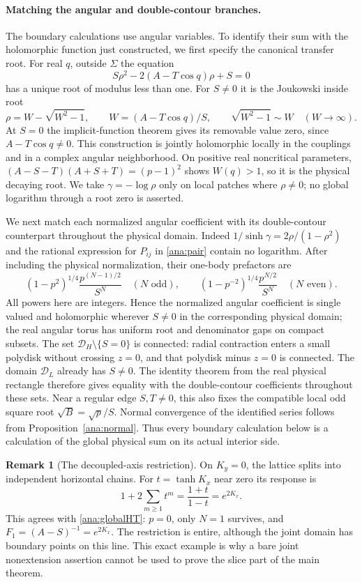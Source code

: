 \documentclass[11pt]{article}
\numberwithin{equation}{section}
\theoremstyle{definition}
\newtheorem{remark}[theorem]{Remark}
\renewcommand{\DH}{\mathcal D_H}
\newcommand{\DL}{\mathcal D_L}
\begin{document}
\paragraph{Matching the angular and double-contour branches.}
The boundary calculations use angular variables. To identify their
sum with the holomorphic function just constructed, we first specify
the canonical transfer root.
For real \(q\), outside \(\Sigma\) the equation
\[
 S\rho^2-2(A-T\cos q)\rho+S=0
\]
has a unique root of modulus less than one. For \(S\ne0\) it is the
Joukowski inside root
\[
 \rho=W-\sqrt{W^2-1},\qquad W=(A-T\cos q)/S,
 \qquad \sqrt{W^2-1}\sim W\quad(W\longrightarrow\infty).
\]
At \(S=0\) the implicit-function theorem gives its removable value
zero, since \(A-T\cos q\ne0\). This construction is jointly
holomorphic locally in the couplings and in a complex angular
neighborhood. On positive real noncritical parameters,
\((A-S-T)(A+S+T)=(p-1)^2\) shows \(W(q)>1\), so it is the
physical decaying root. We take \(\gamma=-\log\rho\) only on
local patches where \(\rho\ne0\); no global logarithm through a root
zero is asserted.

We next match each normalized angular coefficient with its
double-contour counterpart throughout the physical domain. Indeed
\(1/\sinh\gamma=2\rho/(1-\rho^2)\) and the rational expression
for \(P_{ij}\) in \eqref{ana:pair} contain no logarithm. After
including the physical normalization, their one-body prefactors are
\[
 (1-p^2)^{1/4}\frac{p^{(N-1)/2}}{S^N}
 \quad(N\text{ odd}),\qquad
 (1-p^{-2})^{1/4}\frac{p^{N/2}}{S^N}
 \quad(N\text{ even}).
\]
All powers here are integers. Hence the normalized angular coefficient
is single valued and holomorphic wherever \(S\ne0\) in the
corresponding physical domain; the real angular torus has uniform
root and denominator gaps on compact subsets. The set
\(\DH\setminus\{S=0\}\) is connected: radial contraction enters
a small polydisk without crossing \(z=0\), and that polydisk minus
\(z=0\) is connected. The domain \(\DL\) already has \(S\ne0\).
The identity theorem from the real physical rectangle therefore gives
equality with the double-contour coefficients throughout these sets.
Near a regular edge \(S,T\ne0\), this also fixes the compatible
local odd square root \(\sqrt B=\sqrt p/S\). Normal convergence
of the identified series follows from Proposition~\ref{ana:normal}.
Thus every boundary calculation below is a calculation of the global
physical sum on its actual interior side.

\begin{remark}[The decoupled-axis restriction]\label{ana:axis}
On \(K_y=0\), the lattice splits into independent horizontal chains.
For \(t=\tanh K_x\) near zero its response is
\[
 1+2\sum_{m\ge1}t^m=\frac{1+t}{1-t}=e^{2K_x}.
\]
This agrees with \eqref{ana:globalHT}: \(p=0\), only \(N=1\)
survives, and \(F_1=(A-S)^{-1}=e^{2K_x}\).
The restriction is entire, although the joint domain has boundary
points on this line. This exact example is why a bare joint
nonextension assertion cannot be used to prove the slice part
of the main theorem.
\end{remark}
\end{document}
